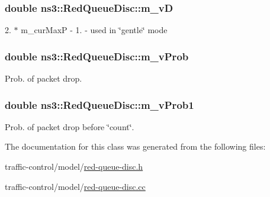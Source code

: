 \subsubsection[{\texorpdfstring{m\+\_\+vD}{m_vD}}]{\setlength{\rightskip}{0pt plus 5cm}double ns3\+::\+Red\+Queue\+Disc\+::m\+\_\+vD\hspace{0.3cm}{\ttfamily [private]}}\hypertarget{classns3_1_1RedQueueDisc_ace5d2581758baa698fc2e5ebe4842026}{}\label{classns3_1_1RedQueueDisc_ace5d2581758baa698fc2e5ebe4842026}


2. $\ast$ m\+\_\+cur\+MaxP -\/ 1. -\/ used in \char`\"{}gentle\char`\"{} mode 

\subsubsection[{\texorpdfstring{m\+\_\+v\+Prob}{m_vProb}}]{\setlength{\rightskip}{0pt plus 5cm}double ns3\+::\+Red\+Queue\+Disc\+::m\+\_\+v\+Prob\hspace{0.3cm}{\ttfamily [private]}}\hypertarget{classns3_1_1RedQueueDisc_aa24ff74b774ceb929bc49fe289fbf31c}{}\label{classns3_1_1RedQueueDisc_aa24ff74b774ceb929bc49fe289fbf31c}


Prob. of packet drop. 

\subsubsection[{\texorpdfstring{m\+\_\+v\+Prob1}{m_vProb1}}]{\setlength{\rightskip}{0pt plus 5cm}double ns3\+::\+Red\+Queue\+Disc\+::m\+\_\+v\+Prob1\hspace{0.3cm}{\ttfamily [private]}}\hypertarget{classns3_1_1RedQueueDisc_a1f46b551657e62ae3064e392fdd6535b}{}\label{classns3_1_1RedQueueDisc_a1f46b551657e62ae3064e392fdd6535b}


Prob. of packet drop before \char`\"{}count\char`\"{}. 



The documentation for this class was generated from the following files\+:\begin{DoxyCompactItemize}
\item 
traffic-\/control/model/\hyperlink{red-queue-disc_8h}{red-\/queue-\/disc.\+h}\item 
traffic-\/control/model/\hyperlink{red-queue-disc_8cc}{red-\/queue-\/disc.\+cc}\end{DoxyCompactItemize}
